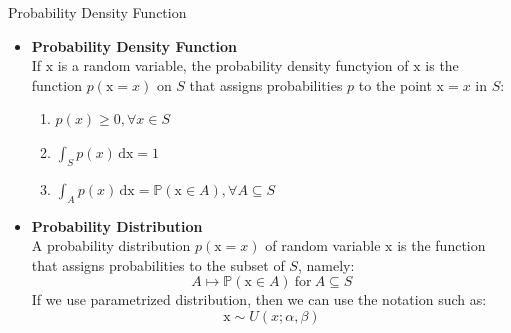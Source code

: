 \documentclass{bredelebeamer}
\begin{document}
\begin{frame}{Probability Density Function}
  \begin{itemize}
    \item\begin{justify}
      \textbf{Probability Density Function}\\
      If $\mathrm{x}$ is a random variable, the probability density functyion of
      $\mathrm{x}$ is the function $p(\mathrm{x}=\mathit{x})$ on $S$ that assigns
      probabilities $p$ to the point $\mathrm{x}=\mathit{x}$ in $S$:
      \begin{enumerate}
        \item $p(\mathit{x}) \geq 0, \forall \mathit{x} \in S$
        \item $\int_S p(\mathit{x})\, \mathrm{dx} = 1$
        \item $\int_A p(\mathit{x})\, \mathrm{dx} = \mathbb{P}(\mathrm{x} \in A), \forall A \subseteq S$
      \end{enumerate}
    \end{justify}
    \item\begin{justify}
      \textbf{Probability Distribution}\\
      A probability distribution $p(\mathrm{x}=\mathit{x})$ of random variable
      $\mathrm{x}$ is the function that assigns probabilities to the subset of
      $S$, namely:
      \begin{equation}
        A \mapsto \mathbb{P}(\mathrm{x} \in A) \  \textrm{for} \  A \subseteq S
      \end{equation}
      If we use parametrized distribution, then we can use the notation such as:
      \begin{equation}
        \mathrm{x} \sim U(\mathit{x}; \alpha, \beta)
      \end{equation}
    \end{justify}
  \end{itemize}
\end{frame}
\end{document}
